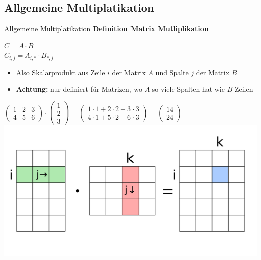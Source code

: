 \documentclass[10pt,aspectratio=169]{beamer}
\begin{document}
  \subsection{Allgemeine Multiplatikation}
  \begin{frame}{Allgemeine Multiplatikation}
    \textbf{Definition Matrix Mutliplikation}
    \begin{center}
      $C = A \cdot B$ \\
      $C_{i,j} = A_{i,*} \cdot B_{*,j}$\\
    \end{center}
    \begin{itemize}
      \item Also Skalarprodukt aus Zeile $i$ der Matrix $A$ und Spalte $j$ der Matrix $B$
      \item \textbf{Achtung:} nur definiert für Matrizen, wo $A$ so viele Spalten hat wie $B$ Zeilen
    \end{itemize}
    \begin{center}
      $\begin{pmatrix}
        1 & 2 & 3\\
        4 & 5 & 6
      \end{pmatrix}
      \cdot
      \begin{pmatrix}
        1\\2\\3
      \end{pmatrix}
      = \begin{pmatrix}
        1\cdot1 + 2\cdot2 + 3\cdot3 \\
        4\cdot1 + 5\cdot2 + 6\cdot3
      \end{pmatrix} =
      \begin{pmatrix}
        14\\24
      \end{pmatrix}$\\
      \includegraphics[scale=0.075]{matrix_mult}
    \end{center}
  \end{frame}
\end{document}
